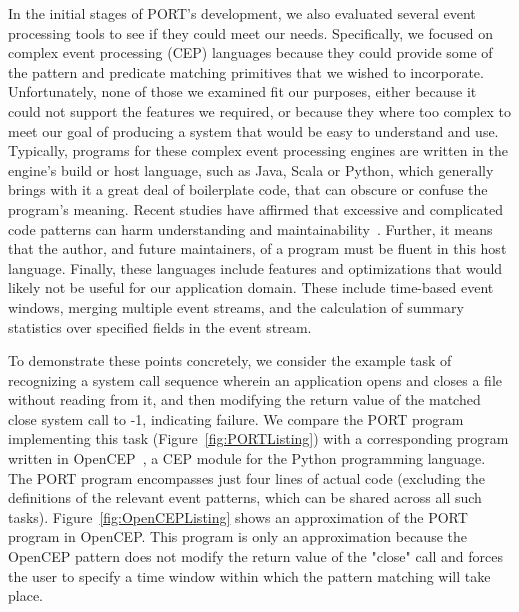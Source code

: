 In the initial stages of PORT's development, we also
evaluated several event processing tools to see if
they could meet our needs.
Specifically,
we focused on
complex event processing (CEP) languages because they
could
provide some of the pattern and predicate matching primitives
that we wished to
incorporate.
Unfortunately,
none of those we examined fit our purposes,
either because it could not support the features
we required, or because they where too complex
to meet our
goal of producing a system
that would be easy to understand and use.
Typically,
programs for these complex event processing engines are
written in the engine's build or host language,
such as Java,
Scala or
Python,
which generally brings with it a great deal of boilerplate code,
that can obscure or confuse
the program's meaning.
Recent studies
have affirmed that excessive and complicated code
patterns can harm
understanding and
maintainability~\cite{misunderstandings}.
Further,
it means that the author,
and future maintainers,
of a
program must be fluent in this host language.
Finally,
these languages include features and optimizations
that would likely not be useful for our application domain.
These include time-based event windows,
merging multiple event streams,
and the calculation of
summary statistics over specified fields in the event stream.

To demonstrate these points concretely, we consider the example task of recognizing a system call sequence wherein an
application opens and closes a file without reading from it, and then modifying the return value of the matched close system call to -1, indicating failure.
We compare the PORT program implementing this task (Figure~\ref{fig:PORTListing}) with a corresponding program written in OpenCEP~\cite{open_cep_website}, a CEP module for the Python programming language.
The PORT program encompasses just four lines of actual code (excluding the definitions of the relevant event patterns, which can be shared across all such tasks).
Figure~\ref{fig:OpenCEPListing} shows an approximation of the PORT program in
OpenCEP.
This program is only
an approximation because the OpenCEP pattern does not modify the return
value of the "close" call and forces the user to specify a time window
within which the pattern matching will take place.


